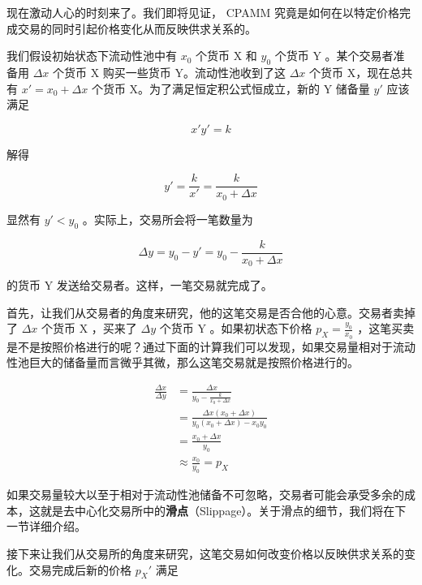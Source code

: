 \documentclass[12pt, a4paper, oneside]{ctexart}
\begin{document}
现在激动人心的时刻来了。我们即将见证， CPAMM 究竟是如何在以特定价格完成交易的同时引起价格变化从而反映供求关系的。

我们假设初始状态下流动性池中有 $x_0$ 个货币 X 和 $y_0$ 个货币 Y 。某个交易者准备用 $\Delta x$ 个货币 X 购买一些货币 Y。流动性池收到了这 $\Delta x$ 个货币 X，现在总共有 $x'=x_0+\Delta x$ 个货币 X。为了满足恒定积公式恒成立，新的 Y 储备量 $y'$ 应该满足

\begin{equation}
    x'y'=k
\end{equation}

\noindent 解得

\begin{equation}
    y'=\frac{k}{x'}=\frac{k}{x_0+\Delta x}
\end{equation}

\noindent 显然有 $y' < y_0$ 。实际上，交易所会将一笔数量为

\begin{equation}
    \Delta y = y_0 - y' = y_0 - \frac{k}{x_0+\Delta x}
\end{equation}

\noindent 的货币 Y 发送给交易者。这样，一笔交易就完成了。

首先，让我们从交易者的角度来研究，他的这笔交易是否合他的心意。交易者卖掉了 $\Delta x$ 个货币 X ，买来了 $\Delta y$ 个货币 Y 。如果初状态下价格 $\displaystyle p_X = \frac{y_0}{x_0}$ ，这笔买卖是不是按照价格进行的呢？通过下面的计算我们可以发现，如果交易量相对于流动性池巨大的储备量而言微乎其微，那么这笔交易就是按照价格进行的。

\begin{equation}
\begin{aligned}
    \frac{\Delta x}{\Delta y} 
    & = \frac{\Delta x}{y_0-\frac{k}{x_0+\Delta x}} \\
    & = \frac{\Delta x (x_0+\Delta x)}{y_0 (x_0+\Delta x) - x_0y_0} \\
    & = \frac{x_0 + \Delta x}{y_0} \\
    & \approx \frac{x_0}{y_0} = p_X
\end{aligned}
\end{equation}

如果交易量较大以至于相对于流动性池储备不可忽略，交易者可能会承受多余的成本，这就是去中心化交易所中的\textbf{滑点}（Slippage）。关于滑点的细节，我们将在下一节详细介绍。

接下来让我们从交易所的角度来研究，这笔交易如何改变价格以反映供求关系的变化。交易完成后新的价格 $p_X'$ 满足
\end{document}
